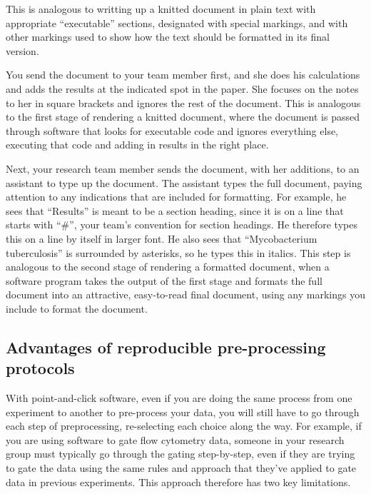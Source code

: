 \documentclass[]{tufte-book}
\begin{document}
This is analogous to writting up a knitted document in plain text with appropriate
``executable'' sections, designated with special markings, and with other markings
used to show how the text should be formatted in its final version.

You send the document to your team member first, and she does his calculations
and adds the results at the indicated spot in the paper. She focuses on the notes to
her in square brackets and ignores the rest of the document. This is analogous
to the first stage of rendering a knitted document, where the document is passed
through software that looks for executable code and ignores everything else,
executing that code and adding in results in the right place.

Next, your research team member sends the document, with her additions, to an
assistant to type up the document. The assistant types the full document, paying
attention to any indications that are included for formatting. For example, he
sees that ``Results'' is meant to be a section heading, since it is on a line that
starts with ``\#'', your team's convention for section headings. He therefore
types this on a line by itself in larger font. He also sees that ``Mycobacterium
tuberculosis'' is surrounded by asterisks, so he types this in italics. This
step is analogous to the second stage of rendering a formatted document, when
a software program takes the output of the first stage and formats the full
document into an attractive, easy-to-read final document, using any markings you
include to format the document.

\hypertarget{advantages-of-reproducible-pre-processing-protocols}{%
\subsection{Advantages of reproducible pre-processing protocols}\label{advantages-of-reproducible-pre-processing-protocols}}

With point-and-click software, even if you are doing the same process from one
experiment to another to pre-process your data, you will still have to go through
each step of preprocessing, re-selecting each choice along the way. For example,
if you are using software to gate flow cytometry data, someone in your research
group must typically go through the gating step-by-step, even if they are trying to
gate the data using the same rules and approach that they've applied to gate data
in previous experiments. This approach therefore has two key limitations.
\end{document}
